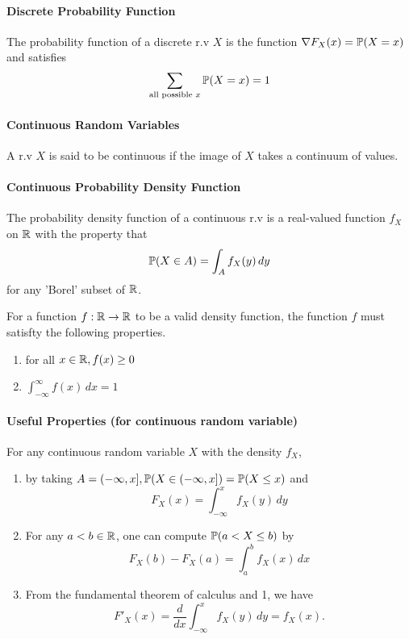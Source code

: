 \paragraph{Discrete Probability Function}
The probability function of a discrete r.v \(X\) is the function \(\nabla F_X(x) = \mathbb{P}(X = x)\) and satisfies
\[\sum_{\text{all possible } x} \mathbb{P}(X = x) = 1\]

\paragraph{Continuous Random Variables}
A r.v \(X\) is said to be continuous if the image of \(X\) takes a continuum of values.

\paragraph{Continuous Probability Density Function}
The probability density function of a continuous r.v is a real-valued function \(f_X\) on \(\mathbb{R}\) with the property that 
\[\mathbb{P}(X \in A) = \int_A f_X(y) \, dy\]
for any 'Borel' subset of \(\mathbb{R}\).

For a function \(f: \mathbb{R} \to \mathbb{R}\) to be a valid density function, the function \(f\) must satisfty the following properties. 
\begin{enumerate}
    \item for all \(x \in \mathbb{R}, f(x) \geq 0\)
    \item \(\int_{-\infty}^{\infty} f(x) \, dx = 1\)
\end{enumerate}

\paragraph{Useful Properties (for continuous random variable)}
For any continuous random variable \(X\) with the density \(f_X\),
\begin{enumerate}
    \item by taking \(A = ( -\infty, x], \mathbb{P}(X \in (-\infty, x]) = \mathbb{P}(X \leq x)\) and 
    \[F_X(x) = \int_{-\infty}^x f_X(y) \, dy\]
    \item For any \(a < b \in \mathbb{R}\), one can compute \(\mathbb{P}(a < X \leq b)\) by 
    \[F_X(b) - F_X(a) = \int_a^b f_X(x) \, dx\]
    \item From the fundamental theorem of calculus and 1, we have
    \[F'_X(x) = \frac{d}{dx}\int_{-\infty}^x f_X(y) \, dy = f_X(x).\]
\end{enumerate}

